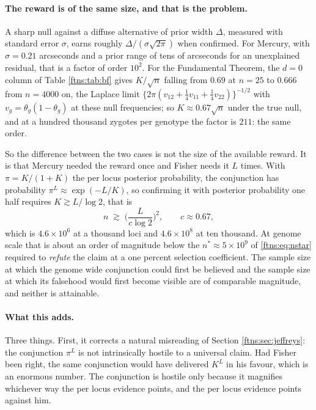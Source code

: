 \paragraph{The reward is of the same size, and that is the problem.} A sharp null against a
diffuse alternative of prior width $\Delta$, measured with standard error $\sigma$, earns roughly
$\Delta/(\sigma\sqrt{2\pi})$ when confirmed. For Mercury, with $\sigma=0.21$ arcseconds and a prior
range of tens of arcseconds for an unexplained residual, that is a factor of order $10^2$. For the
Fundamental Theorem, the $d=0$ column of Table \ref{ftns:tab:bf} gives $K/\sqrt n$ falling from $0.69$ at $n=25$ to $0.666$ from $n=4000$ on, the Laplace limit $\{2\pi(v_{12}+\tfrac14 v_{11}+\tfrac14 v_{22})\}^{-1/2}$ with $v_g=\theta_g(1-\theta_g)$ at these null frequencies; so $K\approx0.67\sqrt n$ under the true null, and at a
hundred thousand zygotes per genotype the factor is $211$: the same order.

So the difference between the two cases is not the size of the available reward. It is that Mercury
needed the reward once and Fisher needs it $L$ times. With $\pi=K/(1+K)$ the per locus posterior
probability, the conjunction has probability $\pi^L\approx\exp(-L/K)$, so confirming it with posterior
probability one half requires $K\gtrsim L/\log2$, that is
\[
n \;\gtrsim\; \Big(\frac{L}{c\log2}\Big)^{2}, \qquad c\approx0.67,
\]
which is $4.6\times10^{6}$ at a thousand loci and $4.6\times10^{8}$ at ten thousand. At genome
scale that is about an order of magnitude below the $n^\ast\approx5\times10^{9}$ of
\eqref{ftns:eq:nstar} required to \emph{refute} the claim at a one percent selection coefficient.
The sample size at which the genome wide conjunction could first be believed and the sample size
at which its falsehood would first become visible are of comparable magnitude, and neither is
attainable.

\paragraph{What this adds.} Three things. First, it corrects a natural misreading of
Section \ref{ftns:sec:jeffreys}: the conjunction $\pi^L$ is not intrinsically hostile to a universal
claim. Had Fisher been right, the same conjunction would have delivered $K^L$ in his favour, which
is an enormous number. The conjunction is hostile only because it magnifies whichever way the
per locus evidence points, and the per locus evidence points against him.

